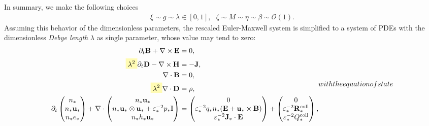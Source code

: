 \documentclass{article}
\begin{document}
In summary, we make the following choices \cite[][sec 2.2]{degond_2017}
\begin{align*}
    \xi \sim g \sim \lambda \in [0,1], \ \ \ \zeta \sim M \sim \eta \sim \beta \sim \mathcal{O}(1).
\end{align*}
Assuming this behavior of the dimensionless parameters, the rescaled Euler-Maxwell system
is simplified to a system of PDEs with the dimensionless \emph{Debye length} $\lambda$ as
single parameter, whose value may tend to zero:
\begin{subequations}
  \label{resc}
\begin{align}
    \partial_t \mathbf{B} + \nabla \times \mathbf{E} &= 0, \label{equ:maxwell_faraday_rescaled} \\ 
    \colorbox{yellow!30}{$\displaystyle\lambda^2$} \partial_t \mathbf{D} - \nabla \times \mathbf{H} &= - \mathbf{J}, \label{equ:maxwell_ampere_rescaled} \\
    \nabla \cdot \mathbf{B} &= 0,  \label{equ:maxwell_gauss_B_rescaled}\\
    \colorbox{yellow!30}{$\displaystyle\lambda^2$} \nabla \cdot \mathbf{D} &= \rho, \label{equ:maxwell_gauss_D_rescaled} \\
    \partial_t
    \begin{pmatrix}
    n_* \\
    n_* \mathbf{u}_* \\
    n_* e_*
    \end{pmatrix}
    + \nabla \cdot
    \begin{pmatrix}
    n_* \mathbf{u}_* \\
    n_* \mathbf{u}_* \otimes \mathbf{u}_* + \varepsilon_*^{-2} p_*\mathbb{I} \\
    n_* h_* \mathbf{u}_*
    \end{pmatrix}
    &=
    \begin{pmatrix}
    0 \\
    \varepsilon_*^{-2} q_* n_* (\mathbf{E} + \mathbf{u}_* \times \mathbf{B}) \\
    \varepsilon_*^{-2} \mathbf{J}_* \cdot \mathbf{E}
    \end{pmatrix}+
    \begin{pmatrix}
    0 \\
    \varepsilon_*^{-2}\mathbf{R}_*^{\text{coll}} \\
    \varepsilon_*^{-2}Q_*^{\text{coll}} 
    \end{pmatrix}, \label{equ:euler_rescaled}
\end{align}
with the equation of state

\end{subequations}
\end{document}
